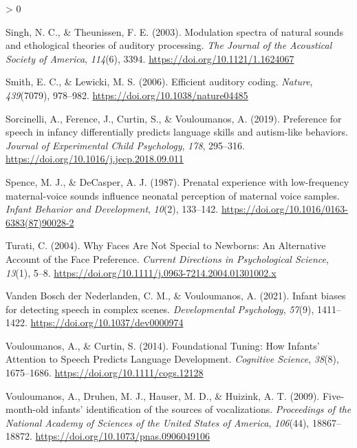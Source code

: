 \documentclass[
  english,
  man]{apa6}
\newlength{\cslhangindent}
\newenvironment{CSLReferences}[2] %
 {%
  \setlength{\parindent}{0pt}
  \ifodd #1 \everypar{\setlength{\hangindent}{\cslhangindent}}\ignorespaces\fi
  \ifnum #2 > 0
  \setlength{\parskip}{#2\baselineskip}
  \fi
 }%
 {}
\begin{document}
\begin{CSLReferences}{1}{0}
\leavevmode\hypertarget{ref-singh_modulation_2003}{}%
Singh, N. C., \& Theunissen, F. E. (2003). Modulation spectra of natural sounds and ethological theories of auditory processing. \emph{The Journal of the Acoustical Society of America}, \emph{114}(6), 3394. \url{https://doi.org/10.1121/1.1624067}

\leavevmode\hypertarget{ref-smith_efficient_2006}{}%
Smith, E. C., \& Lewicki, M. S. (2006). Efficient auditory coding. \emph{Nature}, \emph{439}(7079), 978--982. \url{https://doi.org/10.1038/nature04485}

\leavevmode\hypertarget{ref-sorcinelli_preference_2019}{}%
Sorcinelli, A., Ference, J., Curtin, S., \& Vouloumanos, A. (2019). Preference for speech in infancy differentially predicts language skills and autism-like behaviors. \emph{Journal of Experimental Child Psychology}, \emph{178}, 295--316. \url{https://doi.org/10.1016/j.jecp.2018.09.011}

\leavevmode\hypertarget{ref-spence_prenatal_1987}{}%
Spence, M. J., \& DeCasper, A. J. (1987). Prenatal experience with low-frequency maternal-voice sounds influence neonatal perception of maternal voice samples. \emph{Infant Behavior and Development}, \emph{10}(2), 133--142. \url{https://doi.org/10.1016/0163-6383(87)90028-2}

\leavevmode\hypertarget{ref-turati_why_2004}{}%
Turati, C. (2004). Why {Faces} {Are} {Not} {Special} to {Newborns}: {An} {Alternative} {Account} of the {Face} {Preference}. \emph{Current Directions in Psychological Science}, \emph{13}(1), 5--8. \url{https://doi.org/10.1111/j.0963-7214.2004.01301002.x}

\leavevmode\hypertarget{ref-vanden_bosch_der_nederlanden_infant_2021}{}%
Vanden Bosch der Nederlanden, C. M., \& Vouloumanos, A. (2021). Infant biases for detecting speech in complex scenes. \emph{Developmental Psychology}, \emph{57}(9), 1411--1422. \url{https://doi.org/10.1037/dev0000974}

\leavevmode\hypertarget{ref-vouloumanos_foundational_2014}{}%
Vouloumanos, A., \& Curtin, S. (2014). Foundational {Tuning}: {How} {Infants}' {Attention} to {Speech} {Predicts} {Language} {Development}. \emph{Cognitive Science}, \emph{38}(8), 1675--1686. \url{https://doi.org/10.1111/cogs.12128}

\leavevmode\hypertarget{ref-vouloumanos_five-month-old_2009}{}%
Vouloumanos, A., Druhen, M. J., Hauser, M. D., \& Huizink, A. T. (2009). Five-month-old infants' identification of the sources of vocalizations. \emph{Proceedings of the National Academy of Sciences of the United States of America}, \emph{106}(44), 18867--18872. \url{https://doi.org/10.1073/pnas.0906049106}


\end{CSLReferences}
\end{document}
